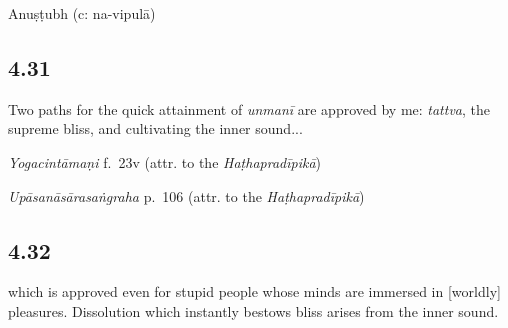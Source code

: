 \begin{ekdosis}
\begin{metre}[hp04_030]
Anuṣṭubh (c: na-vipulā)
\end{metre}

\subsection*{4.31}
\begin{translation}[hp04_031]
Two paths for the quick attainment of \emph{unmanī} are approved by me: \emph{tattva}, the supreme bliss, and cultivating the inner sound...
\end{translation}


\begin{testimonia}[hp04_031]
\emph{Yogacintāmaṇi} f.~23v (attr. to the \emph{Haṭhapradīpikā})
\begin{versinnote}
\end{versinnote}

\emph{Upāsanāsārasaṅgraha} p.~106 (attr. to the \emph{Haṭhapradīpikā})
\begin{versinnote}
\end{versinnote}
\end{testimonia}



\subsection*{4.32}
\begin{translation}[hp04_032]
which is approved even for stupid people whose minds are immersed in [worldly] pleasures. Dissolution which instantly bestows bliss arises from the inner sound.
\end{translation}




\end{ekdosis}
